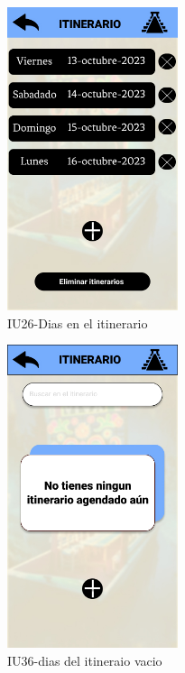 \begin{figure}[htbp]
        \centering
        \includegraphics[width= 5cm]{Pantallas Prototipo3/IU26 Pantalla Dias Itinerario.jpg}
        \caption{IU26-Dias en el itinerario}
        \label{fig:enter-label}
\end{figure}

\begin{figure}[htbp]
        \centering
        \includegraphics[width= 5cm]{Pantallas Prototipo3/IU36-dias del itineraio vacio.jpg}
        \caption{IU36-dias del itineraio vacio}
        \label{fig:enter-label}
        \vspace{200pt}
\end{figure}
\newpage


\pagebreak
